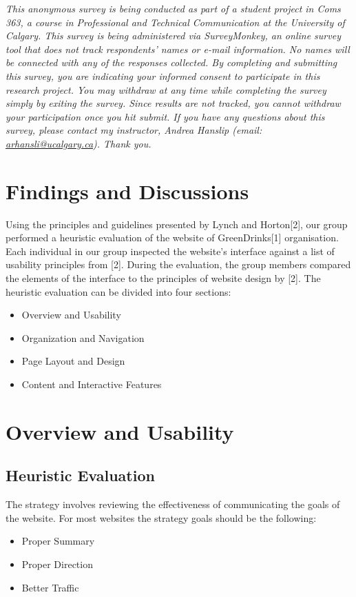 \documentclass[12pt]{article}
\begin{document}
\emph{This anonymous survey is being conducted as part of a student project in Coms 363, a course in Professional and Technical Communication at the University of Calgary. This survey is being administered via SurveyMonkey, an online survey tool that does not track respondents’ names or e-mail information. No names will be connected with any of the responses collected. By completing and submitting this survey, you are indicating your informed consent to participate in this research project. You may withdraw at any time while completing the survey simply by exiting the survey. Since results are not tracked, you cannot withdraw your participation once you hit submit. If you have any questions about this survey, please contact my instructor, Andrea Hanslip (email: \url{arhansli@ucalgary.ca}). Thank you.}

\section{Findings and Discussions}
Using the principles and guidelines presented by Lynch and Horton[2], our group performed a heuristic evaluation of the website of GreenDrinks[1] organisation. Each individual in our group inspected the website’s interface against a list of usability principles from [2].  During the evaluation, the group members compared the elements of the interface to the principles of website design by [2]. The heuristic evaluation can be divided into four sections:
\begin{itemize}
\item Overview and Usability 
\item Organization and Navigation
\item Page Layout and Design
\item Content and Interactive Features
\end{itemize}
\section{Overview and Usability}
\subsection{Heuristic Evaluation}
The strategy involves reviewing the effectiveness of communicating the goals of the website. For most websites the strategy goals should be the following:
\begin{itemize}
\item Proper Summary
\item Proper Direction
\item Better Traffic
\end{itemize}
\end{document}
